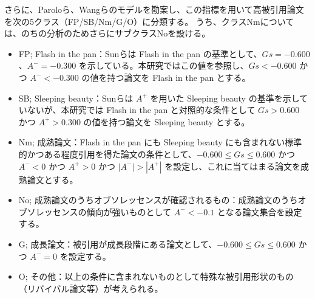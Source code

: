さらに、Paroloら\cite{Par1}、Wangら\cite{Wan1}のモデルを勘案し、この指標を用いて高被引用論文を次の5クラス（FP/SB/Nm/G/O）に分類する。
うち、クラスNmについては、のちの分析のためさらにサブクラスNoを設ける。
\begin{itemize}
\item FP; Flash in the pan：Sunらは Flash in the pan の基準として、$Gs=-0.600$、$A^- = -0.300$ を示している。本研究ではこの値を参照し、$Gs < -0.600$ かつ $A^- < -0.300$ の値を持つ論文を Flash in the pan とする。
\item SB; Sleeping beauty：Sunらは $A^+$ を用いた Sleeping beauty の基準を示していないが、本研究では Flash in the pan と対照的な条件として $Gs > 0.600$ かつ $A^+ > 0.300$ の値を持つ論文を Sleeping beauty とする。
\item Nm; 成熟論文：Flash in the pan にも Sleeping beauty にも含まれない標準的かつある程度引用を得た論文の条件として、$-0.600 \leq Gs \leq 0.600$ かつ $A^- < 0$ かつ $A^+ > 0$ かつ $|A^-| > |A^+|$ を設定し、これに当てはまる論文を成熟論文とする。
\item No; 成熟論文のうちオブソレッセンスが確認されるもの：成熟論文のうちオブソレッセンスの傾向が強いものとして $A^- < -0.1$ となる論文集合を設定する。
\item G; 成長論文：被引用が成長段階にある論文として、$-0.600 \leq Gs \leq 0.600$ かつ $A^- = 0$ を設定する。
\item O; その他：以上の条件に含まれないものとして特殊な被引用形状のもの（リバイバル論文等）が考えられる。
\end{itemize}
